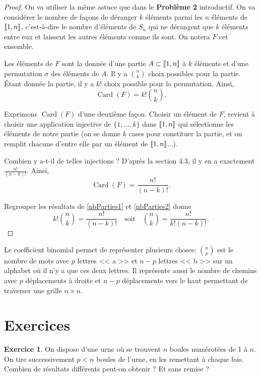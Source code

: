 \documentclass[twoside,11pt]{article}
\DeclareMathOperator{\Card}{\mathrm{Card}}
\DeclarePairedDelimiter{\zint}{[\![}{]\!]}
\theoremstyle{definition}
\newtheorem{exo}{Exercice}
\theoremstyle{remark}
\theoremstyle{theorem}
\begin{document}
\begin{proof}
On va utiliser la même astuce que dans le \textbf{Problème 2} introductif. On va considérer le nombre de façons de déranger $k$ éléments parmi les $n$ éléments de $\zint{1,n}$, c'est-à-dire le nombre d'éléments de $S_n$ qui ne dérangent que $k$ éléments entre eux et laissent les autres éléments comme ils sont. On notera $F$ cet ensemble.

Les éléments de $F$ sont la donnée d'une partie $A\subset \zint{1,n}$ à $k$ éléments et d'une permutation $\sigma$ des éléments de $A$. Il y a $\binom{n}{k}$ choix possibles pour la partie. Étant donnée la partie, il y a $k!$ choix possible pour la permutation. Ainsi,
\begin{equation}\label{nbParties1}
\Card(F) = k!\binom{n}{k}.
\end{equation}

Exprimons $\Card(F)$ d'une deuxième façon. Choisir un élément de $F$, revient à choisir une application injective de $\{1,\ldots,k\}$ dans $\zint{1,n}$ qui sélectionne les éléments de notre partie (on se donne $k$ cases pour constituer la partie, et on remplit chacune d'entre elle par un élément de $\zint{1,n}$...). 

Combien y a-t-il de telles injections ? D'après la section 4.3, il y en a exactement $\frac{n!}{(n-k)!}$. Ainsi,
\begin{equation}\label{nbParties2}
\Card(F) = \frac{n!}{(n-k)!}.
\end{equation}

Regrouper les résultats de \eqref{nbParties1} et \eqref{nbParties2} donne
\[
k!\binom{n}{k} = \frac{n!}{(n-k)!}\quad \text{soit}\quad \boxed{\binom{n}{k} = \frac{n!}{k!(n-k)!}.}
\]
\end{proof}

Le coefficient binomial permet de représenter plusieurs choses: $\displaystyle \binom{n}{p}$ est le nombre de mots avec $p$ lettres << a >> et $n-p$ lettres << b >> sur un alphabet où il n'y a que ces deux lettres. Il représente aussi le nombre de chemins avec $p$ déplacements à droite et $n-p$ déplacements vers le haut permettant de traverser une grille $n\times n$.

\section{Exercices}

\begin{exo}
	On dispose d'une urne où se trouvent $n$ boules numérotées de 1 à $n$. On tire successivement $p<n$ boules de l'urne, en les remettant à chaque fois. Combien de résultats différents peut-on obtenir ? Et sans remise ?
\end{exo}
\end{document}
